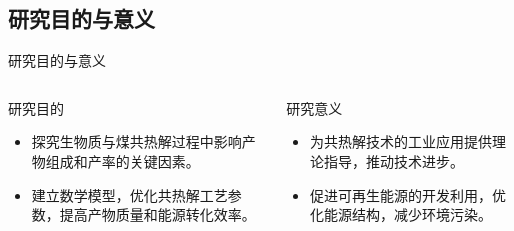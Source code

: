 \documentclass{beamer}
\begin{document}
\subsection{研究目的与意义}
\begin{frame}{研究目的与意义}
    \justifying
    \begin{columns}
        \begin{block}{研究目的}
            \begin{itemize}
                \item 探究生物质与煤共热解过程中影响产物组成和产率的关键因素。
                \item 建立数学模型，优化共热解工艺参数，提高产物质量和能源转化效率。
            \end{itemize}
        \end{block}
        \begin{block}{研究意义}
            \begin{itemize}
                \item 为共热解技术的工业应用提供理论指导，推动技术进步。
                \item 促进可再生能源的开发利用，优化能源结构，减少环境污染。
            \end{itemize}
        \end{block}
    \end{columns}
\end{frame}

\end{document}
